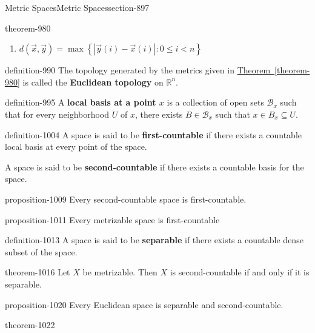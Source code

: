\documentclass[oneside,10pt,]{article}
\newcommand{\terminology}[1]{\textbf{#1}}
\newcommand{\mb}{\mathbb}
\newcommand{\mc}{\mathcal}
\newcommand{\setBuilder}[2]{\left\{#1:#2\right\}}
\newcommand{\lt}{<}
\begin{document}
\begin{sectionptx}{Metric Spaces}{}{Metric Spaces}{}{}{section-897}
\begin{theorem}{}{}{theorem-980}
\begin{enumerate}
\item\hypertarget{li-988}{}\(d(\vec x,\vec y)=\max\setBuilder{|\vec y(i)-\vec x(i)|}{0\leq i\lt n}\)%
\end{enumerate}
\end{theorem}
\begin{definition}{}{definition-990}%
\hypertarget{p-991}{}%
The topology generated by the metrics given in \hyperref[theorem-980]{Theorem~\ref{theorem-980}} is called the \terminology{Euclidean topology} on \(\mb R^n\).%
\end{definition}
\begin{definition}{}{definition-995}%
\hypertarget{p-996}{}%
A \terminology{local basis at a point \(x\)} is a collection of open sets \(\mc B_x\) such that for every neighborhood \(U\) of \(x\), there exists \(B\in\mc B_x\) such that \(x\in B_x\subseteq U\).%
\end{definition}
\begin{definition}{}{definition-1004}%
\hypertarget{p-1005}{}%
A space is said to be \terminology{first-countable} if there exists a countable local basis at every point of the space.%
\par
\hypertarget{p-1007}{}%
A space is said to be \terminology{second-countable} if there exists  a countable basis for the space.%
\end{definition}
\begin{proposition}{}{}{proposition-1009}%
\hypertarget{p-1010}{}%
Every second-countable space is first-countable.%
\end{proposition}
\begin{proposition}{}{}{proposition-1011}%
\hypertarget{p-1012}{}%
Every metrizable space is first-countable%
\end{proposition}
\begin{definition}{}{definition-1013}%
\hypertarget{p-1014}{}%
A space is said to be \terminology{separable} if there exists a countable dense subset of the space.%
\end{definition}
\begin{theorem}{}{}{theorem-1016}%
\hypertarget{p-1017}{}%
Let \(X\) be metrizable. Then \(X\) is second-countable if and only if it is separable.%
\end{theorem}
\begin{proposition}{}{}{proposition-1020}%
\hypertarget{p-1021}{}%
Every Euclidean space is separable and second-countable.%
\end{proposition}
\begin{theorem}{}{}{theorem-1022}%

\end{theorem}
\end{sectionptx}
\end{document}
